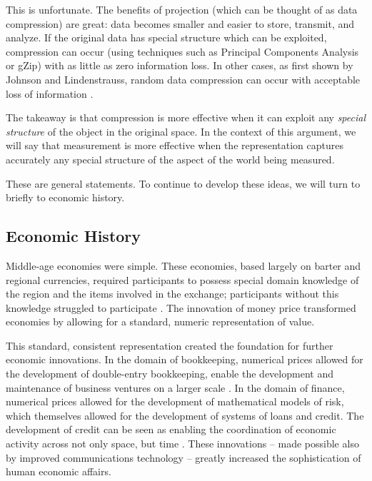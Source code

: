 \documentclass[12pt]{book}
\begin{document}
This is unfortunate.
The benefits of projection (which can be thought of as data compression) are great: data becomes smaller and easier to store, transmit, and analyze.
If the original data has special structure which can be exploited, compression can occur (using techniques such as Principal Components Analysis or gZip) with as little as zero information loss.
In other cases, as first shown by Johnson and Lindenstrauss, random data compression can occur with acceptable loss of information \cite{dasgupta}.

The takeaway is that compression is more effective when it can exploit any \textit{special structure} of the object in the original space.
In the context of this argument, we will say that measurement is more effective when the representation captures accurately any special structure of the aspect of the world being measured.

These are general statements.
To continue to develop these ideas, we will turn to briefly to economic history.

\printglossary

\subsection{Economic History}

Middle-age economies were simple.
These economies, based largely on barter and regional currencies, required participants to possess special domain knowledge of the region and the items involved in the exchange; participants without this knowledge struggled to participate \cite{heilbroner}.
The innovation of money price transformed economies by allowing for a standard, numeric representation of value.

This standard, consistent representation created the foundation for further economic innovations.
In the domain of bookkeeping, numerical prices allowed for the development of double-entry bookkeeping, enable the development and maintenance of business ventures on a larger scale \cite{ferguson}.
In the domain of finance, numerical prices allowed for the development of mathematical models of risk, which themselves allowed for the development of systems of loans and credit.
The development of credit can be seen as enabling the coordination of economic activity across not only space, but time \cite{ferguson}.
These innovations -- made possible also by improved communications technology -- greatly increased the sophistication of human economic affairs.
\end{document}
